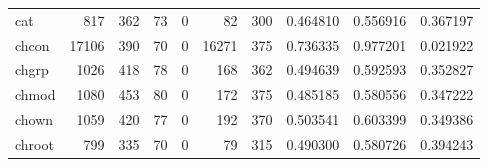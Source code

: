 \begin{longtable}{lrrrrrrrrr}
cat       &                                                817 &                                                362 &                                                 73 &                                                  0 &                                                 82 &                                                300 &                                           0.464810 &                               0.556916 &                             0.367197 \\
chcon     &                                              17106 &                                                390 &                                                 70 &                                                  0 &                                              16271 &                                                375 &                                           0.736335 &                               0.977201 &                             0.021922 \\
chgrp     &                                               1026 &                                                418 &                                                 78 &                                                  0 &                                                168 &                                                362 &                                           0.494639 &                               0.592593 &                             0.352827 \\
chmod     &                                               1080 &                                                453 &                                                 80 &                                                  0 &                                                172 &                                                375 &                                           0.485185 &                               0.580556 &                             0.347222 \\
chown     &                                               1059 &                                                420 &                                                 77 &                                                  0 &                                                192 &                                                370 &                                           0.503541 &                               0.603399 &                             0.349386 \\
chroot    &                                                799 &                                                335 &                                                 70 &                                                  0 &                                                 79 &                                                315 &                                           0.490300 &                               0.580726 &                             0.394243 \\

\end{longtable}
